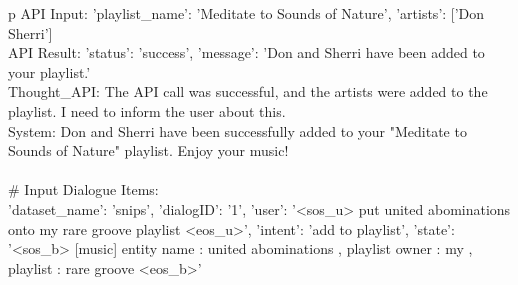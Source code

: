 \begin{table*}
\begin{tabular}{p\linewidth}
API Input: {'playlist\_name': 'Meditate to Sounds of Nature', 'artists': ['Don Sherri']}   \\
API Result: {'status': 'success', 'message': 'Don and Sherri have been added to your playlist.'}   \\
Thought\_API: The API call was successful, and the artists were added to the playlist. I need to inform the user about this.   \\
System: Don and Sherri have been successfully added to your "Meditate to Sounds of Nature" playlist. Enjoy your music!   \\
 \\
\# Input Dialogue Items: \\
{'dataset\_name': 'snips', 'dialogID': '1', 'user': '<sos\_u> put united abominations onto my rare groove playlist <eos\_u>', 'intent': 'add to playlist', 'state': '<sos\_b> [music] entity name : united abominations , playlist owner : my , playlist : rare groove <eos\_b>'} \\
\bottomrule
\end{tabular}
\end{table*}